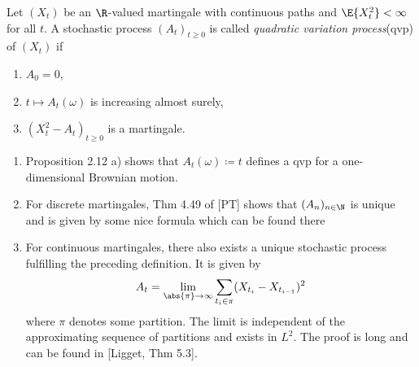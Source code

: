 \begin{defi}
Let $(X_t)$ be an $\R$-valued martingale with continuous paths and $\E{X_t^2}<\infty$ for all $t$.
A stochastic process $(A_t)_{t \geq 0}$ is called \emph{quadratic variation process}(qvp) of $(X_t)$ if
\begin{enumerate}[label=(\roman*)]
\item $A_0=0$,
\item $t \mapsto A_t(\omega)$ is increasing almost surely,
\item $(X_t^2-A_t)_{t \geq 0}$ is a martingale.
\end{enumerate}
\end{defi}
\begin{bem}
\begin{enumerate}[label=\alph*)]
\item Proposition 2.12 a) shows that $A_t(\omega)\coloneqq t$ defines a qvp for a one-dimensional Brownian motion.
\item For discrete martingales, Thm 4.49 of [PT] shows that $(A_n)_{n\in \N}$ is unique and is given by some nice formula which can be found there
\item For continuous martingales, there also exists a unique stochastic process fulfilling the preceding definition.
It is given by
\begin{align*}
A_t= \lim_{\abs{\pi}\to \infty} \sum_{t_i \in \pi}(X_{t_i}-X_{t_{i-1}})^2
\end{align*}
where $\pi$ denotes some partition. The limit is independent of the approximating sequence of partitions and exists in $\mathit{L}^2$.
The proof is long and can be found in [Ligget, Thm 5.3].
\end{enumerate}
\end{bem}

